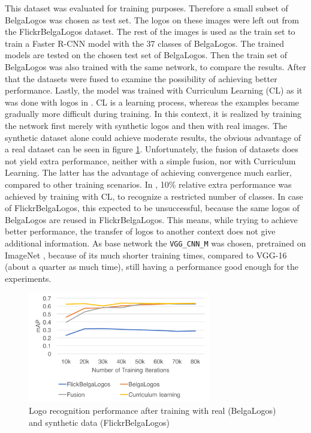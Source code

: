 This dataset was evaluated for training purposes. Therefore a small subset of BelgaLogos was chosen as test set. The logos on these images were left out from the FlickrBelgaLogos dataset. The rest of the images is used as the train set to train a Faster R-CNN model with the 37 classes of BelgaLogos. The trained models are tested on the chosen test set of BelgaLogos. Then the train set of BelgaLogos was also trained with the same network, to compare the results. After that the datasets were fused to examine the possibility of achieving better performance. Lastly, the model was trained with Curriculum Learning \cite{Bengio_curriculumlearning} (CL) as it was done with logos in \cite{DBLP:journals/corr/SuZG16}. CL is a learning process, whereas the examples became gradually more difficult during training. In this context, it is realized by training the network first merely with synthetic logos and then with real images.
\bigbreak
The synthetic dataset alone could achieve moderate results, the obvious advantage of a real dataset can be seen in figure \ref{f:flbltrain}. Unfortunately, the fusion of datasets does not yield extra performance, neither with a simple fusion, nor with Curriculum Learning. The latter has the advantage of achieving convergence much earlier, compared to other training scenarios. In \cite{DBLP:journals/corr/SuZG16}, 10\% relative extra performance was achieved by training with CL, to recognize a restricted number of classes. In case of FlickrBelgaLogos, this expected to be unsuccessful, because the same logos of BelgaLogos are reused in FlickrBelgaLogos. This means, while trying to achieve better performance, the transfer of logos to another context does not give additional information. As base network the \texttt{VGG\_CNN\_M} \cite{Chatfield14} was chosen, pretrained on ImageNet \cite{imagenet_cvpr09}, because of its much shorter training times, compared to VGG-16 (about a quarter as much time), still having a performance good enough for the experiments.
\begin{figure}
  \centering
  \includegraphics[width=80mm]{images/mt/bltest.png}
  \caption{Logo recognition performance after training with real (BelgaLogos) and synthetic data (FlickrBelgaLogos)}
  \label{f:flbltrain}
\end{figure}


